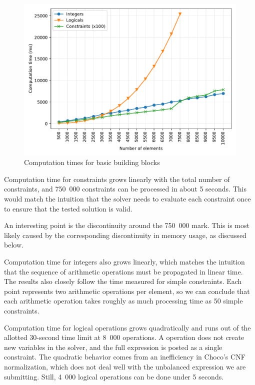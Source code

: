 \begin{figure}[t]
    \centering
    \includegraphics[width=1\linewidth]{img/variables.pdf}
    \caption{Computation times for basic building blocks}
    \label{fig:variables:time}
\end{figure}

Computation time for constraints grows linearly with the total number of constraints,
and 750~000 constraints can be processed in about 5 seconds. This would match the
intuition that the solver needs to evaluate each constraint once to ensure that the
tested solution is valid.

An interesting point is the discontinuity around the 750~000 mark. This is most likely
caused by the corresponding discontinuity in memory usage, as discussed below.

Computation time for integers also grows linearly, which matches the intuition that the
sequence of arithmetic operations must be propagated in linear time. The results also
closely follow the time measured for simple constraints. Each point represents two
arithmetic operations per element, so we can conclude that each arithmetic operation
takes roughly as much processing time as 50 simple constraints.

Computation time for logical operations grows quadratically and runs out of the allotted
30-second time limit at 8~000 operations. A  operation does not create new
variables in the solver, and the full expression is posted as a single constraint. The
quadratic behavior comes from an inefficiency in Choco's CNF normalization, which does
not deal well with the unbalanced expression we are submitting. Still, 4~000 logical
operations can be done under 5 seconds.

